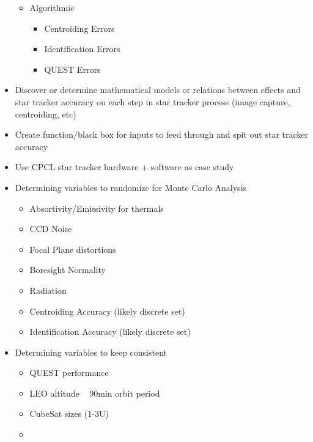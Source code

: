 \begin{itemize}
\begin{itemize}
        \item Algorithmic
        \begin{itemize}
            \item Centroiding Errors 
            \item Identification Errors 
            \item QUEST Errors 
        \end{itemize}
    \end{itemize}
    \item Discover or determine mathematical models or relations between effects and star tracker accuracy on each step in star tracker process (image capture, centroiding, etc)
    \item Create function/black box for inputs to feed through and spit out star tracker accuracy 
    \item Use CPCL star tracker hardware + software as case study
    \item Determining variables to randomize for Monte Carlo Analysis 
    \begin{itemize}
        \item Absortivity/Emissivity for thermals 
        \item CCD Noise 
        \item Focal Plane distortions 
        \item Boresight Normality
        \item Radiation
        \item Centroiding Accuracy (likely discrete set)
        \item Identification Accuracy (likely discrete set)
    \end{itemize}
    \item Determining variables to keep consistent
    \begin{itemize}
        \item QUEST performance 
        \item LEO altitude ~ 90min orbit period 
        \item CubeSat sizes (1-3U)
        \item  
    \end{itemize}
\end{itemize}

